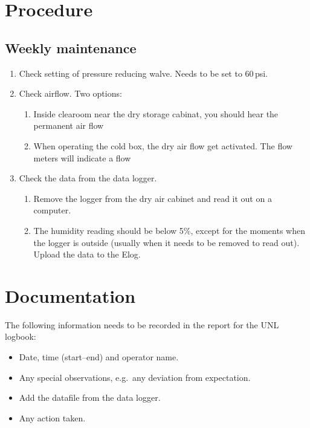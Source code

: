 \documentclass[12pt]{unlsilabsop}
\begin{document}

\section{Procedure}

\subsection{Weekly maintenance}
\begin{enumerate}
    \item Check setting of pressure reducing walve. Needs to be set to 60\,psi.
    \item Check airflow. Two options:
    \begin{enumerate}
        \item Inside clearoom near the dry storage cabinat, you should hear the permanent air flow
        \item When operating the cold box, the dry air flow get activated. The flow meters will indicate a flow
    \end{enumerate}
    \item Check the data from the data logger.
    \begin{enumerate}
        \item Remove the logger from the dry air cabinet and read it out on a computer.
        \item The humidity reading should be below 5\%, except for the moments when the logger is outside (usually when it needs to be removed to read out). Upload the data to the Elog.
    \end{enumerate}
\end{enumerate}

\section{Documentation}
The following information needs to be recorded in the report for the UNL logbook:
\begin{itemize}
    \item Date, time (start--end) and operator name.
    \item Any special observations, e.g.~any deviation from expectation.
    \item Add the datafile from the data logger.
    \item Any action taken.
\end{itemize}
\end{document}
